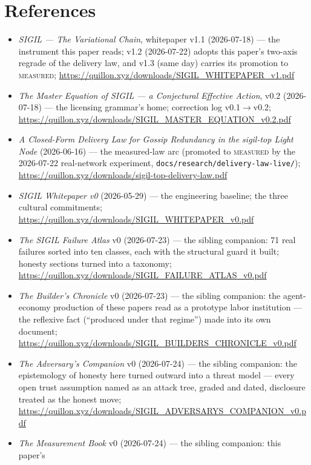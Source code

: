 \documentclass[10pt,a4paper]{article}
\begin{document}
\section*{References}

\small
\begin{itemize}[leftmargin=1.2em,itemsep=1pt]
\item \emph{SIGIL — The Variational Chain}, whitepaper v1.1 (2026-07-18) — the
instrument this paper reads; v1.2 (2026-07-22) adopts this paper's two-axis
regrade of the delivery law, and v1.3 (same day) carries its promotion to
\textsc{measured};
\url{https://quillon.xyz/downloads/SIGIL_WHITEPAPER_v1.pdf}
\item \emph{The Master Equation of SIGIL — a Conjectural Effective Action}, v0.2
(2026-07-18) — the licensing grammar's home; correction log v0.1$\to$v0.2;
\url{https://quillon.xyz/downloads/SIGIL_MASTER_EQUATION_v0.2.pdf}
\item \emph{A Closed-Form Delivery Law for Gossip Redundancy in the sigil-top
Light Node} (2026-06-16) — the measured-law arc (promoted to \textsc{measured} by
the 2026-07-22 real-network experiment, \texttt{docs/research/delivery-law-live/});
\url{https://quillon.xyz/downloads/sigil-top-delivery-law.pdf}
\item \emph{SIGIL Whitepaper v0} (2026-05-29) — the engineering baseline; the
three cultural commitments;
\url{https://quillon.xyz/downloads/SIGIL_WHITEPAPER_v0.pdf}
\item \emph{The SIGIL Failure Atlas} v0 (2026-07-23) — the sibling companion: 71 real
failures sorted into ten classes, each with the structural guard it built; honesty
sections turned into a taxonomy;
\url{https://quillon.xyz/downloads/SIGIL_FAILURE_ATLAS_v0.pdf}
\item \emph{The Builder's Chronicle} v0 (2026-07-23) — the sibling companion: the
agent-economy production of these papers read as a prototype labor institution — the
reflexive fact (``produced under that regime'') made into its own document;
\url{https://quillon.xyz/downloads/SIGIL_BUILDERS_CHRONICLE_v0.pdf}
\item \emph{The Adversary's Companion} v0 (2026-07-24) — the sibling companion: the
epistemology of honesty here turned outward into a threat model — every open trust
assumption named as an attack tree, graded and dated, disclosure treated as the honest
move; \url{https://quillon.xyz/downloads/SIGIL_ADVERSARYS_COMPANION_v0.pdf}
\item \emph{The Measurement Book} v0 (2026-07-24) — the sibling companion: this paper's

\end{itemize}
\end{document}

